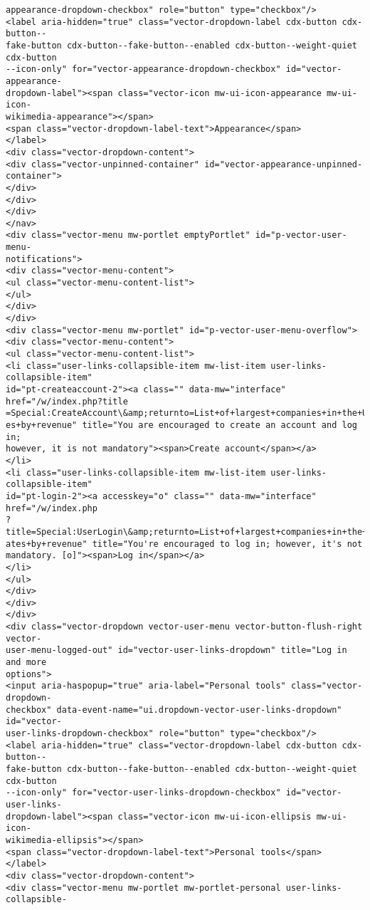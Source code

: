 \documentclass[11pt]{article}
\begin{document}
\begin{Verbatim}[commandchars=\\\{\}]
appearance-dropdown-checkbox" role="button" type="checkbox"/>
<label aria-hidden="true" class="vector-dropdown-label cdx-button cdx-button--
fake-button cdx-button--fake-button--enabled cdx-button--weight-quiet cdx-button
--icon-only" for="vector-appearance-dropdown-checkbox" id="vector-appearance-
dropdown-label"><span class="vector-icon mw-ui-icon-appearance mw-ui-icon-
wikimedia-appearance"></span>
<span class="vector-dropdown-label-text">Appearance</span>
</label>
<div class="vector-dropdown-content">
<div class="vector-unpinned-container" id="vector-appearance-unpinned-
container">
</div>
</div>
</div>
</nav>
<div class="vector-menu mw-portlet emptyPortlet" id="p-vector-user-menu-
notifications">
<div class="vector-menu-content">
<ul class="vector-menu-content-list">
</ul>
</div>
</div>
<div class="vector-menu mw-portlet" id="p-vector-user-menu-overflow">
<div class="vector-menu-content">
<ul class="vector-menu-content-list">
<li class="user-links-collapsible-item mw-list-item user-links-collapsible-item"
id="pt-createaccount-2"><a class="" data-mw="interface" href="/w/index.php?title
=Special:CreateAccount\&amp;returnto=List+of+largest+companies+in+the+United+Stat
es+by+revenue" title="You are encouraged to create an account and log in;
however, it is not mandatory"><span>Create account</span></a>
</li>
<li class="user-links-collapsible-item mw-list-item user-links-collapsible-item"
id="pt-login-2"><a accesskey="o" class="" data-mw="interface" href="/w/index.php
?title=Special:UserLogin\&amp;returnto=List+of+largest+companies+in+the+United+St
ates+by+revenue" title="You're encouraged to log in; however, it's not
mandatory. [o]"><span>Log in</span></a>
</li>
</ul>
</div>
</div>
</div>
<div class="vector-dropdown vector-user-menu vector-button-flush-right vector-
user-menu-logged-out" id="vector-user-links-dropdown" title="Log in and more
options">
<input aria-haspopup="true" aria-label="Personal tools" class="vector-dropdown-
checkbox" data-event-name="ui.dropdown-vector-user-links-dropdown" id="vector-
user-links-dropdown-checkbox" role="button" type="checkbox"/>
<label aria-hidden="true" class="vector-dropdown-label cdx-button cdx-button--
fake-button cdx-button--fake-button--enabled cdx-button--weight-quiet cdx-button
--icon-only" for="vector-user-links-dropdown-checkbox" id="vector-user-links-
dropdown-label"><span class="vector-icon mw-ui-icon-ellipsis mw-ui-icon-
wikimedia-ellipsis"></span>
<span class="vector-dropdown-label-text">Personal tools</span>
</label>
<div class="vector-dropdown-content">
<div class="vector-menu mw-portlet mw-portlet-personal user-links-collapsible-

\end{Verbatim}
\end{document}
